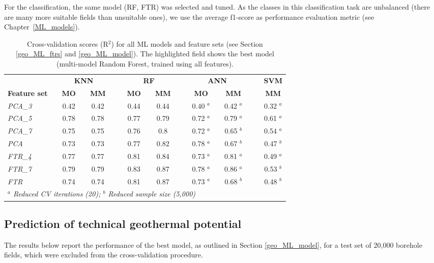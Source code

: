 For the classification, the same model (RF, FTR) was selected and tuned. As the classes in this classification task are unbalanced (there are many more suitable fields than unsuitable ones), we use the average f1-score as performance evaluation metric (see Chapter~\ref{ML_models}).

\begin{table}[tb]
\footnotesize
\centering
\caption{Cross-validation scores (R$^2$) for all ML models and feature sets (see Section \ref{geo_ML_ftrs} and \ref{geo_ML_model}). The highlighted field shows the best model (multi-model Random Forest, trained using all features).}
\label{tab:geo_ML_CV}
\begin{tabular}{llclcllclcllclcllc}
\hline
 &  & \multicolumn{3}{c}{\textbf{KNN}} &  &  & \multicolumn{3}{c}{\textbf{RF}} &  &  & \multicolumn{3}{c}{\textbf{ANN}} &  &  & \textbf{SVM} \\
\textbf{Feature set} &  & \textbf{MO} &  & \textbf{MM} &  &  & \textbf{MO} &  & \textbf{MM} &  &  & \textbf{MO} &  & \textbf{MM} &  &  & \textbf{MM} \\ \hline
\textit{PCA\_3} &  & 0.42 &  & 0.42 &  &  & 0.44 &  & 0.44 &  &  & 0.40 $^a$ &  & 0.42 $^a$ &  &  & 0.32 $^a$ \\
\textit{PCA\_5} &  & 0.78 &  & 0.78 &  &  & 0.77 &  & 0.79 &  &  & 0.72 $^a$ &  & 0.79 $^a$ &  &  & 0.61 $^a$ \\
\textit{PCA\_7} &  & 0.75 &  & 0.75 &  &  & 0.76 &  & 0.8 &  &  & 0.72 $^a$ &  & 0.65 $^b$ &  &  & 0.54 $^a$ \\
\textit{PCA} &  & 0.73 &  & 0.73 &  &  & 0.77 &  & 0.82 &  &  & 0.78 $^a$ &  & 0.67 $^b$ &  &  & 0.47 $^b$ \\
\textit{FTR\_4} &  & 0.77 &  & 0.77 &  &  & 0.81 &  & 0.84 &  &  & 0.73 $^a$ &  & 0.81 $^a$ &  &  & 0.49 $^a$ \\
\textit{FTR\_7} &  & 0.79 &  & 0.79 &  &  & 0.83 &  & 0.87 &  &  & 0.78 $^a$ &  & 0.86 $^a$ &  &  & 0.53 $^b$ \\
\textit{FTR} &  & 0.74 &  & 0.74 &  &  & 0.81 & \multicolumn{3}{c}{\cellcolor[HTML]{D9D9D9}0.87} &  & 0.73 $^a$ &  & 0.68 $^b$ &  &  & 0.48 $^b$ \\ \hline
\multicolumn{18}{l}{\textit{$^a$ Reduced CV iterations (20); $^b$ Reduced sample size (5,000)}}
\end{tabular}%
\end{table}

\subsection{Prediction of technical geothermal potential}
\label{geo_ML_results}
The results below report the performance of the best model, as outlined in Section \ref{geo_ML_model}, for a test set of 20,000 borehole fields, which were excluded from the cross-validation procedure.

